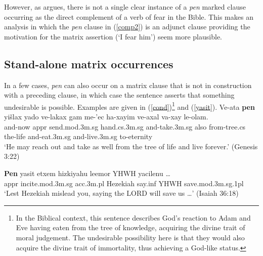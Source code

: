 \documentclass[output=paper,colorlinks,citecolor=brown]{langscibook}
\begin{document}
However, as \citet{azar81} argues, there is not a single clear instance of a \textit{pen} marked clause occurring as the direct complement of a verb of fear in the Bible. This makes an analysis in which the \textit{pen} clause in (\ref{comp2}) is an adjunct clause providing the motivation for the matrix assertion (`I fear him') seem more plausible. 

\subsection{Stand-alone matrix occurrences}
\label{subsec:matrix}
In a few cases, \textit{pen} can also occur on a matrix clause that is not in construction with a preceding clause, in which case the sentence asserts that something undesirable is possible. Examples are given in (\ref{cond})\footnote{In the Biblical context, this sentence describes God's reaction to Adam and Eve having eaten from the tree of knowledge, acquiring the divine trait of moral judgement. The undesirable possibility here is that they would also acquire the divine trait of immortality, thus achieving a God-like status.} and (\ref{yasit}).
\ea
\label{cond}
\gll Ve-ata \textbf{pen} yišlax yado ve-lakax gam me-'ec ha-xayim ve-axal va-xay le-olam. \\
and-now {\sc appr} send.{\sc mod.3m.sg} hand.{\sc cs.3m.sg} and-take.{\sc 3m.sg}  also from-tree.{\sc cs} the-life and-eat.{\sc 3m.sg} and-live.{\sc 3m.sg} to-eternity \\
\glt `He may reach out and take as well from the tree of life and live forever.' (Genesis 3:22)
\z

\ea
\label{yasit}
\gll \textbf{Pen} yasit etxem hizkiyahu leemor YHWH yacilenu {\ldots}\\
{\sc appr} incite.{\sc mod.3m.sg} {\sc acc.3m.pl} Hezekiah say.{\sc inf} YHWH save.{\sc mod.3m.sg.1pl} \\

\glt `Lest Hezekiah mislead you, saying the LORD will save us {\ldots}' (Isaiah 36:18)
\z
\end{document}
